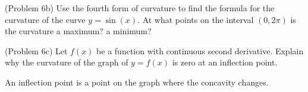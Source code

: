 \documentclass[handout]{ximera}
\begin{document}
\begin{problem}(Problem 6b)
Use the fourth form of curvature to find the formula for the curvature of the curve $y = \sin(x)$.  
At what points on the interval $(0, 2\pi)$ is the curvature a maximum? a minimum?\\
\end{problem}


\begin{problem}(Problem 6c)
Let $f(x)$ be a function with continuous second derivative. Explain why the curvature of the graph of $y = f(x)$ is zero at an inflection point.\\
\begin{hint}
An inflection point is a point on the graph where the concavity changes.
\end{hint}
\end{problem}
\end{document}
